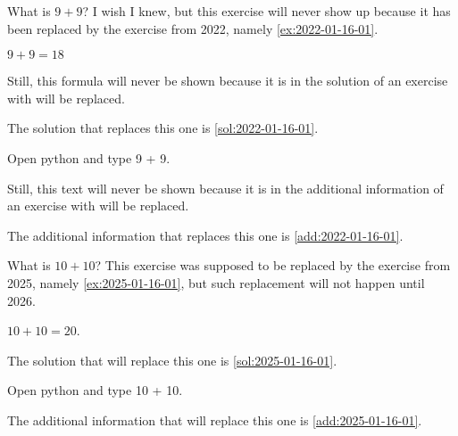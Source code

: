 \documentclass[oneside]{book}
\begin{document}
\begin{exercise}[examdate={January 16, 2023}, examproblemnumber={1}, examproblemid={2023-01-16-01}, replacedbyexamproblemid={2022-01-16-01}, replacementsinceacademicyear={2025/2026}]
  What is \(9 + 9\)? I wish I knew, but this exercise will never show up because it has been replaced by the exercise from 2022, namely \cref{ex:2022-01-16-01}.
\end{exercise}

\begin{solution}
  \(9 + 9 = 18\)

Still, this formula will never be shown because it is in the solution of an exercise with will be replaced.

The solution that replaces this one is \cref{sol:2022-01-16-01}.
\end{solution}

\begin{additionalinformation}
Open python and type 9 + 9.

Still, this text will never be shown because it is in the additional information of an exercise with will be replaced.

The additional information that replaces this one is \cref{add:2022-01-16-01}.
\end{additionalinformation}

\begin{exercise}[examdate={January 16, 2024}, examproblemnumber={1}, examproblemid={2024-01-16-01}, replacedbyexamproblemid={2023-01-16-01}, replacementsinceacademicyear={2026/2027}]
  What is \(10 + 10\)? This exercise was supposed to be replaced by the exercise from 2025, namely \cref{ex:2025-01-16-01}, but such replacement will not happen until 2026.
\end{exercise}

\begin{solution}
  \(10 + 10 = 20\).

  The solution that will replace this one is \cref{sol:2025-01-16-01}.
\end{solution}

\begin{additionalinformation}
Open python and type 10 + 10.

The additional information that will replace this one is \cref{add:2025-01-16-01}.
\end{additionalinformation}

\end{document}
